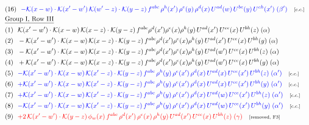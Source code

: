 \documentclass[9pt]{article}
\begin{document}
\begin{align}
&\quad\text{(16)}\ \ \textcolor{blue}{-\mathcal{K}(x-w)\cdot\mathcal{K}(x'-w')\,\mathcal{K}(w'-z)\cdot\mathcal{K}(y-z)\, f^{abc}\,\rho^{h}(x')\,\rho^{e}(y)\,\rho^{d}(x)\,U^{ad}(w)\,U^{be}(y)\,U^{ch}(x')\;(\beta')}\quad\text{\scriptsize[c.c.]}\notag\\
&\quad\underline{\text{Group I, Row III}}\notag\\
&\quad\text{(1)}\ \ \mathcal{K}(x'-w')\cdot \mathcal{K}(x-w)\, \mathcal{K}(x-z)\cdot \mathcal{K}(y-z)\, f^{abc}\rho^{d}(x')\rho^{e}(x)\rho^{h}(y)\, U^{ad}(x')\,U^{ce}(x)\, U^{bh}(z)\;(\alpha)\notag\\
&\quad\text{(2)}\ \ - \mathcal{K}(x'-w')\cdot \mathcal{K}(x-w)\, \mathcal{K}(x-z)\cdot \mathcal{K}(y-z)\, f^{abc}\rho^{d}(x')\rho^{e}(x)\rho^{h}(y)\, U^{ad}(x')\,U^{ce}(x)\, U^{bh}(y)\;(\alpha)\notag\\
&\quad\text{(3)}\ \ -\mathcal{K}(x'-w')\cdot \mathcal{K}(x-w)\, \mathcal{K}(x-z)\cdot \mathcal{K}(y-z)\, f^{abc}\rho^{d}(x')\rho^{e}(x)\rho^{h}(y)\, U^{ad}(w')\,U^{ce}(x)\, U^{bh}(z)\;(\alpha)\notag\\
&\quad\text{(4)}\ \ +\mathcal{K}(x'-w')\cdot \mathcal{K}(x-w)\, \mathcal{K}(x-z)\cdot \mathcal{K}(y-z)\, f^{abc}\rho^{d}(x')\rho^{e}(x)\rho^{h}(y)\, U^{ad}(w')\,U^{ce}(x)\, U^{bh}(y)\;(\alpha)\notag\\
&\quad\text{(5)}\ \ \textcolor{blue}{-\mathcal{K}(x'-w')\cdot\mathcal{K}(x-w)\,\mathcal{K}(x'-z)\cdot\mathcal{K}(y-z)\, f^{abc}\,\rho^{h}(y)\,\rho^{e}(x')\,\rho^{d}(x)\,U^{ad}(x)\,U^{ce}(x')\,U^{bh}(z)\;(\alpha')}\quad\text{\scriptsize[c.c.]}\notag\\
&\quad\text{(6)}\ \ \textcolor{blue}{+\mathcal{K}(x'-w')\cdot\mathcal{K}(x-w)\,\mathcal{K}(x'-z)\cdot\mathcal{K}(y-z)\, f^{abc}\,\rho^{h}(y)\,\rho^{e}(x')\,\rho^{d}(x)\,U^{ad}(x)\,U^{ce}(x')\,U^{bh}(y)\;(\alpha')}\quad\text{\scriptsize[c.c.]}\notag\\
&\quad\text{(7)}\ \ \textcolor{blue}{+\mathcal{K}(x'-w')\cdot\mathcal{K}(x-w)\,\mathcal{K}(x'-z)\cdot\mathcal{K}(y-z)\, f^{abc}\,\rho^{h}(y)\,\rho^{e}(x')\,\rho^{d}(x)\,U^{ad}(w)\,U^{ce}(x')\,U^{bh}(z)\;(\alpha')}\quad\text{\scriptsize[c.c.]}\notag\\
&\quad\text{(8)}\ \ \textcolor{blue}{-\mathcal{K}(x'-w')\cdot\mathcal{K}(x-w)\,\mathcal{K}(x'-z)\cdot\mathcal{K}(y-z)\, f^{abc}\,\rho^{h}(y)\,\rho^{e}(x')\,\rho^{d}(x)\,U^{ad}(w)\,U^{ce}(x')\,U^{bh}(y)\;(\alpha')}\quad\text{\scriptsize[c.c.]}\notag\\
&\quad\text{(9)}\ \ \textcolor{red}{+2\,\mathcal{K}(x'-w')\cdot \mathcal{K}(y-z)\, \mathcal{\phi}_{w}(x)\, f^{abc}\, \rho^{d}(x')\,\rho^{e}(x)\,\rho^{h}(y)\, U^{ad}(x')\, U^{ce}(x)\, U^{bh}(z)\;(\gamma)}\quad\text{\scriptsize[removed, F3]}\notag\\

\end{align}
\end{document}
